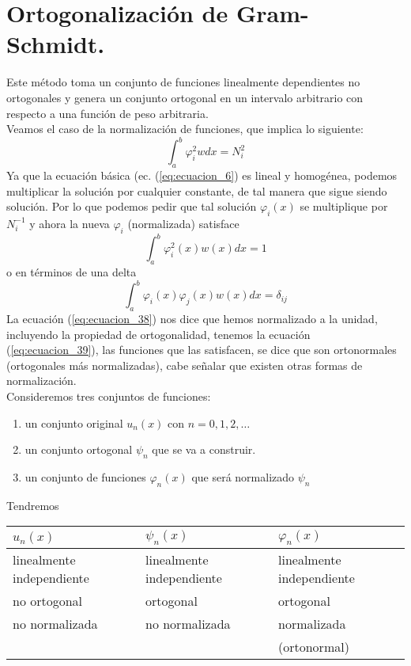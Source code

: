 \section{Ortogonalización de Gram-Schmidt.}
Este método toma un conjunto de funciones linealmente dependientes no ortogonales y genera un conjunto ortogonal en un intervalo arbitrario con respecto a una función de peso arbitraria.
\\
Veamos el caso de la normalización de funciones, que implica lo siguiente:
\[ \int_{a}^{b} \varphi_{i}^{2} w dx  =  N_{i}^{2} \]
Ya que la ecuación básica (ec. (\ref{eq:ecuacion_6}) es lineal y homogénea, podemos multiplicar la solución por cualquier constante, de tal manera que sigue siendo solución. Por lo que podemos pedir que tal solución $\varphi_{i}(x)$ se multiplique por $N_{i}^{-1}$ y ahora la nueva $\varphi_{i}$ (normalizada) satisface
\begin{equation}
\int_{a}^{b} \varphi_{i}^{2} (x) w(x) dx = 1
\label{eq:ecuacion_38}
\end{equation}
o en términos de una delta
\begin{equation}
\int_{a}^{b} \varphi_{i}(x) \varphi_{j} (x) w(x) dx = \delta_{ij}
\label{eq:ecuacion_39}
\end{equation}
La ecuación (\ref{eq:ecuacion_38}) nos dice que hemos normalizado a la unidad, incluyendo la propiedad de ortogonalidad, tenemos la ecuación (\ref{eq:ecuacion_39}), las funciones que las satisfacen, se dice que son ortonormales (ortogonales más normalizadas), cabe señalar que existen otras formas de normalización.
\\
Consideremos tres conjuntos de funciones:
\begin{enumerate}
\item un conjunto original $u_{n}(x)$ con $n=0,1,2,\ldots$
\item un conjunto ortogonal $\psi_{n}$ que se va a construir.
\item un conjunto de funciones $\varphi_{n}(x)$ que será normalizado $\psi_{n}$
\end{enumerate}
Tendremos
\\
\begin{tabular}{l l l}
\hline
$u_{n}(x)$ & $\psi_{n}(x)$ & $\varphi_{n}(x)$ \\ \hline
linealmente independiente &    linealmente independiente & linealmente independiente \\
no ortogonal & ortogonal & ortogonal \\
no  normalizada & no normalizada & normalizada \\
 & & (ortonormal)
\end{tabular}
